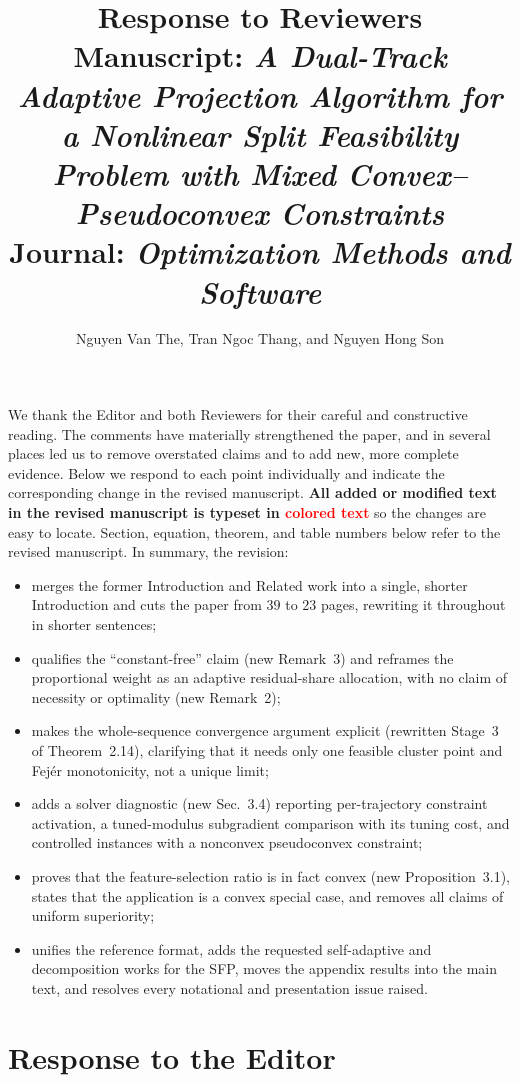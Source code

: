 \documentclass[11pt]{article}
\title{\vspace{-2em}Response to Reviewers\\[0.3em] \large Manuscript: \emph{A Dual-Track Adaptive Projection Algorithm for a Nonlinear Split Feasibility Problem with Mixed Convex--Pseudoconvex Constraints}\\[0.2em] \normalsize Journal: \emph{Optimization Methods and Software}}
\author{Nguyen Van The, Tran Ngoc Thang, and Nguyen Hong Son}
\date{}
\begin{document}
\maketitle
\vspace{-2em}

\noindent We thank the Editor and both Reviewers for their careful and constructive reading. The comments have materially strengthened the paper, and in several places led us to remove overstated claims and to add new, more complete evidence. Below we respond to each point individually and indicate the corresponding change in the revised manuscript. \textbf{All added or modified text in the revised manuscript is typeset in \textcolor{red}{colored text}} so the changes are easy to locate. Section, equation, theorem, and table numbers below refer to the revised manuscript. In summary, the revision:
\begin{itemize}[nosep]
\item merges the former Introduction and Related work into a single, shorter Introduction and cuts the paper from $39$ to $23$ pages, rewriting it throughout in shorter sentences;
\item qualifies the ``constant-free'' claim (new Remark~3) and reframes the proportional weight as an adaptive residual-share allocation, with no claim of necessity or optimality (new Remark~2);
\item makes the whole-sequence convergence argument explicit (rewritten Stage~3 of Theorem~2.14), clarifying that it needs only one feasible cluster point and Fej\'er monotonicity, not a unique limit;
\item adds a solver diagnostic (new Sec.~3.4) reporting per-trajectory constraint activation, a tuned-modulus subgradient comparison with its tuning cost, and controlled instances with a nonconvex pseudoconvex constraint;
\item proves that the feature-selection ratio is in fact convex (new Proposition~3.1), states that the application is a convex special case, and removes all claims of uniform superiority;
\item unifies the reference format, adds the requested self-adaptive and decomposition works for the SFP, moves the appendix results into the main text, and resolves every notational and presentation issue raised.
\end{itemize}

\section*{Response to the Editor}
\end{document}
